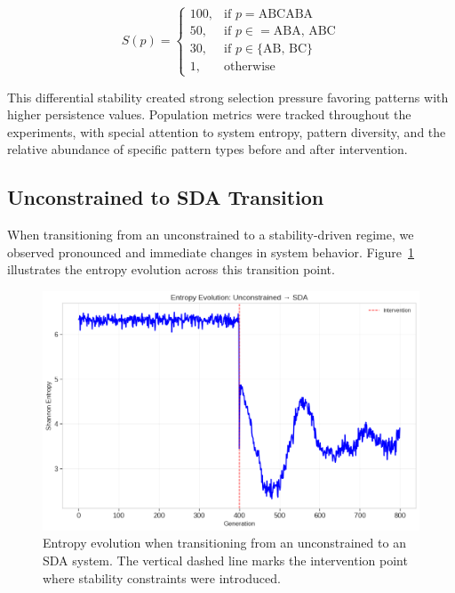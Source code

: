 \documentclass[preprint,12pt]{elsarticle}
\begin{document}
\begin{equation}
S(p) = 
\begin{cases}
100, & \text{if } p = \text{ABCABA} \\
50, & \text{if } p \in = \text{ABA, ABC} \\
30, & \text{if } p \in \{\text{AB, BC}\} \\
1, & \text{otherwise}
\end{cases}
\end{equation}

This differential stability created strong selection pressure favoring patterns with higher persistence values. Population metrics were tracked throughout the experiments, with special attention to system entropy, pattern diversity, and the relative abundance of specific pattern types before and after intervention.

\subsection{Unconstrained to SDA Transition}
\label{subsec:unconstrained-to-sda}

When transitioning from an unconstrained to a stability-driven regime, we observed pronounced and immediate changes in system behavior. Figure~\ref{fig:u2s-entropy} illustrates the entropy evolution across this transition point.

\begin{figure}[h]
    \centering
    \includegraphics[width=1\textwidth]{unconstrained_to_sda_entropy.png}
    \caption{Entropy evolution when transitioning from an unconstrained to an SDA system. The vertical dashed line marks the intervention point where stability constraints were introduced.}
    \label{fig:u2s-entropy}
\end{figure}
\end{document}
